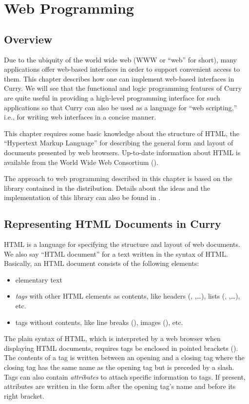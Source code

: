 \chapter{Web Programming}

\section{Overview}

Due to the ubiquity of the world wide web (WWW or ``web'' for short),
many applications offer web-based interfaces in order to support
convenient access to them. This chapter describes how one can
implement web-based interfaces in Curry. We will see that
the functional and logic programming features of Curry
are quite useful in providing a high-level programming interface
for such applications so that Curry can also be used as
a language for ``web scripting,'' i.e., for writing web interfaces
in a concise manner.

This chapter requires some basic knowledge about the structure
of HTML, the ``Hypertext Markup Language'' for describing the
general form and layout of documents presented by web browsers.
Up-to-date information about HTML is available from the
World Wide Web Consortium (\wwwc).

The approach to web programming described in this chapter is based
on the library  
contained in the \pakcs{} distribution. Details about the
ideas and the implementation of this library can also be found in
\cite{Hanus01PADL}.


\section{Representing HTML Documents in Curry}

HTML is a language for specifying the structure and layout of
web documents. We also say ``HTML document'' for a text
written in the syntax of HTML. Basically, an HTML document
consists of the following elements:
\begin{itemize}
\item elementary text
\item \emph{tags} with other HTML elements as contents,
like headers (, ,\ldots),
lists (, ,\ldots), etc.
\item tags without contents, like
line breaks (), images (), etc.
\end{itemize}
The plain syntax of HTML, which is interpreted by a web browser
when displaying HTML documents, requires tags be enclosed in
pointed brackets (\code{<$\cdots$>}).
The contents of a tag is written between an opening and a closing tag
where the closing tag has the same name as the opening tag but is
preceded by a slash.
Tags can also contain \emph{attributes}
to attach specific information to tags. If present, attributes
are written in the form
 after the opening tag's name
and before its right bracket.

